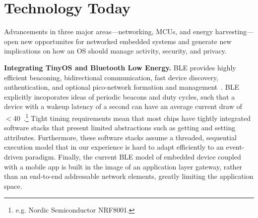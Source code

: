 \section{Technology Today}
Advancements in three major areas---networking, MCUs, and energy
harvesting---open new opportunites for networked embedded systems and generate
new implications on how an OS should manage activity, security, and privacy.


\smallskip\noindent
\textbf{Integrating TinyOS and Bluetooth Low Energy.}
BLE provides highly efficient beaconing,
bidirectional communication, fast device discovery, authentication, and
optional pico-network formation and management~\cite{ble-overview}.
BLE explicitly incoporates ideas of periodic beacons and duty cycles,
such that a device with a wakeup latency of a second can have
an average current draw of $< 40$~\uA.\footnote{
  e.g. Nordic Semiconductor NRF8001.
}
%
Tight timing requirements mean that most chips have tightly
integrated software stacks that present limited abstractions such as
getting and setting attributes. Furthermore, these software stacks
assume a threaded, sequential execution model that in our experience
is hard to adapt efficiently to an event-driven paradigm. 
%
Finally, the current BLE model of embedded device coupled with a
mobile app is built in the image of an application layer gateway,
rather than an end-to-end addressable network elements, greatly
limiting the application space.



